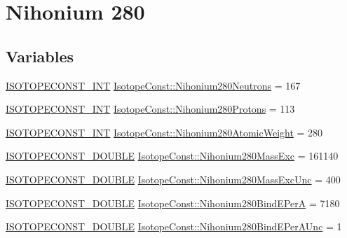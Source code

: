 \hypertarget{group___isotope_const-_nihonium-_nh280}{}\section{Nihonium 280}
\label{group___isotope_const-_nihonium-_nh280}
\subsection*{Variables}
\begin{DoxyCompactItemize}
\item 
\mbox{\hyperlink{group___isotope_const-_macros_ga5f18360b3e99483a35c32d789e62621c}{I\+S\+O\+T\+O\+P\+E\+C\+O\+N\+S\+T\+\_\+\+I\+NT}} \mbox{\hyperlink{group___isotope_const-_nihonium-_nh280_gaafd5b7a7e6681481b4964700b2028b4a}{Isotope\+Const\+::\+Nihonium280\+Neutrons}} = 167
\item 
\mbox{\hyperlink{group___isotope_const-_macros_ga5f18360b3e99483a35c32d789e62621c}{I\+S\+O\+T\+O\+P\+E\+C\+O\+N\+S\+T\+\_\+\+I\+NT}} \mbox{\hyperlink{group___isotope_const-_nihonium-_nh280_ga01fa88cb44c135ea469f7dfc01b2ab83}{Isotope\+Const\+::\+Nihonium280\+Protons}} = 113
\item 
\mbox{\hyperlink{group___isotope_const-_macros_ga5f18360b3e99483a35c32d789e62621c}{I\+S\+O\+T\+O\+P\+E\+C\+O\+N\+S\+T\+\_\+\+I\+NT}} \mbox{\hyperlink{group___isotope_const-_nihonium-_nh280_ga03ca1a055312e3a6db97dd455e921bc6}{Isotope\+Const\+::\+Nihonium280\+Atomic\+Weight}} = 280
\item 
\mbox{\hyperlink{group___isotope_const-_macros_ga8f45a7272ce02c0b4c65c44636ed719a}{I\+S\+O\+T\+O\+P\+E\+C\+O\+N\+S\+T\+\_\+\+D\+O\+U\+B\+LE}} \mbox{\hyperlink{group___isotope_const-_nihonium-_nh280_ga75441a51777688cce274682faa1f32ac}{Isotope\+Const\+::\+Nihonium280\+Mass\+Exc}} = 161140
\item 
\mbox{\hyperlink{group___isotope_const-_macros_ga8f45a7272ce02c0b4c65c44636ed719a}{I\+S\+O\+T\+O\+P\+E\+C\+O\+N\+S\+T\+\_\+\+D\+O\+U\+B\+LE}} \mbox{\hyperlink{group___isotope_const-_nihonium-_nh280_ga69fa72b448286cf35fa75acb086a66d5}{Isotope\+Const\+::\+Nihonium280\+Mass\+Exc\+Unc}} = 400
\item 
\mbox{\hyperlink{group___isotope_const-_macros_ga8f45a7272ce02c0b4c65c44636ed719a}{I\+S\+O\+T\+O\+P\+E\+C\+O\+N\+S\+T\+\_\+\+D\+O\+U\+B\+LE}} \mbox{\hyperlink{group___isotope_const-_nihonium-_nh280_gaca4618e7deef9a349344c12f8a38b817}{Isotope\+Const\+::\+Nihonium280\+Bind\+E\+PerA}} = 7180
\item 
\mbox{\hyperlink{group___isotope_const-_macros_ga8f45a7272ce02c0b4c65c44636ed719a}{I\+S\+O\+T\+O\+P\+E\+C\+O\+N\+S\+T\+\_\+\+D\+O\+U\+B\+LE}} \mbox{\hyperlink{group___isotope_const-_nihonium-_nh280_ga9fb817bb361c51ce882649c4e6c122c6}{Isotope\+Const\+::\+Nihonium280\+Bind\+E\+Per\+A\+Unc}} = 1

\end{DoxyCompactItemize}
